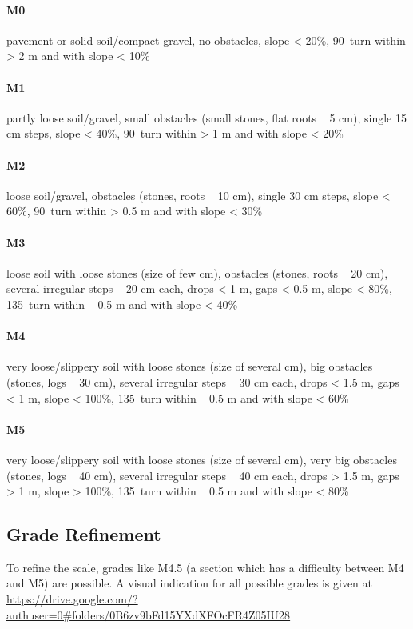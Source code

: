 \documentclass[a4paper,oneside]{scrartcl}
\begin{document}
\paragraph{M0}
pavement or solid soil/compact gravel, no obstacles, slope < 20\%,
90\textdegree\ turn within > 2 m and with slope < 10\%

\paragraph{M1}
partly loose soil/gravel,
small obstacles (small stones, flat roots ~ 5 cm),
single 15 cm steps,
slope < 40\%,
90\textdegree\ turn within > 1 m and with slope < 20\%

\paragraph{M2}
loose soil/gravel,
obstacles (stones, roots ~ 10 cm),
single 30 cm steps,
slope < 60\%,
90\textdegree\ turn within > 0.5 m and with slope < 30\%

\paragraph{M3}
loose soil with loose stones (size of few cm),
obstacles (stones, roots ~ 20 cm),
several irregular steps ~ 20 cm each,
drops < 1 m, gaps < 0.5 m,
slope < 80\%,
135\textdegree\ turn within ~ 0.5 m and with slope < 40\%

\paragraph{M4}
very loose/slippery soil with loose stones (size of several cm),
big obstacles (stones, logs ~ 30 cm),
several irregular steps ~ 30 cm each,
drops < 1.5 m, gaps < 1 m,
slope < 100\%,
135\textdegree\ turn within ~ 0.5 m and with slope < 60\%

\paragraph{M5}
very loose/slippery soil with loose stones (size of several cm),
very big obstacles (stones, logs ~ 40 cm),
several irregular steps ~ 40 cm each,
drops > 1.5 m, gaps > 1 m,
slope > 100\%,
135\textdegree\ turn within ~ 0.5 m and with slope < 80\%

\subsection{Grade Refinement}
To refine the scale, grades like M4.5 (a section which has a difficulty between
M4 and M5) are possible.
A visual indication for all possible grades is given at
\url{https://drive.google.com/?authuser=0#folders/0B6zv9bFd15YXdXFOcFR4Z05IU28}
\end{document}
